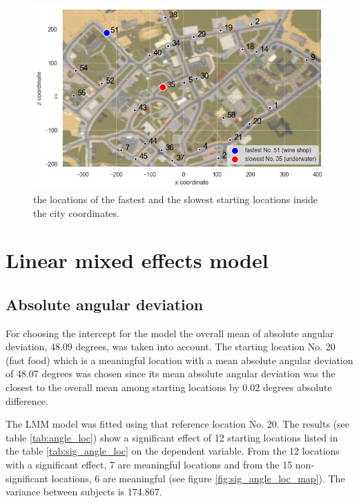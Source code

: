 \begin{figure}[!htb]
	\centering
	\includegraphics[width=140mm]{figures/fastest_slowest_starting_locations_RT_map.png}
	\caption[Locations of fastest and slowest starting locations in city]{the locations of the fastest and the slowest starting locations inside the city coordinates.}
	\label{fig:fastest_slowest_locs}
\end{figure}

\section{Linear mixed effects model}

\subsection{Absolute angular deviation}

For choosing the intercept for the model the overall mean of absolute angular deviation, 48.09 degrees, was taken into account. The starting location No. 20 (fast food) which is a meaningful location with a mean absolute angular deviation of 48.07 degrees was chosen since its mean absolute angular deviation was the closest to the overall mean among starting locations by 0.02 degrees absolute difference.

The LMM model was fitted using that reference location No. 20. The results (see table \ref{tab:angle_loc}) show a significant effect of 12 starting locations listed in the table \ref{tab:sig_angle_loc} on the dependent variable. From the 12 locations with a significant effect, 7 are meaningful locations and from the 15 non-significant locations, 6 are meaningful (see figure \ref{fig:sig_angle_loc_map}). The variance between subjects is 174.867. 
                                                                                            
